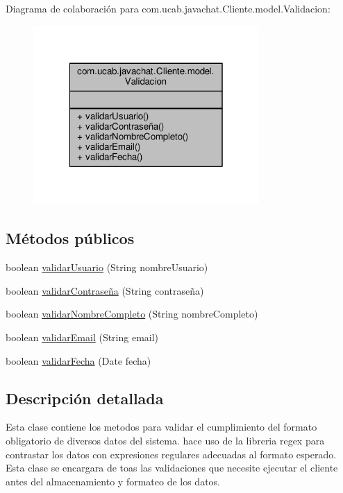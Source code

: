 Diagrama de colaboración para com.\-ucab.\-javachat.\-Cliente.\-model.\-Validacion\-:
\nopagebreak
\begin{figure}[H]
\begin{center}
\leavevmode
\includegraphics[width=244pt]{dc/d28/classcom_1_1ucab_1_1javachat_1_1_cliente_1_1model_1_1_validacion__coll__graph}
\end{center}
\end{figure}
\subsection*{Métodos públicos}
\begin{DoxyCompactItemize}
\item 
boolean \hyperlink{classcom_1_1ucab_1_1javachat_1_1_cliente_1_1model_1_1_validacion_a4d7e1104a20469f92144e9580b34f901}{validar\-Usuario} (String nombre\-Usuario)
\item 
boolean \hyperlink{classcom_1_1ucab_1_1javachat_1_1_cliente_1_1model_1_1_validacion_a03b6327d88c6fb0e69ef43ed72918e46}{validar\-Contraseña} (String contraseña)
\item 
boolean \hyperlink{classcom_1_1ucab_1_1javachat_1_1_cliente_1_1model_1_1_validacion_a1efa66eae747068c6492c79f9442be1a}{validar\-Nombre\-Completo} (String nombre\-Completo)
\item 
boolean \hyperlink{classcom_1_1ucab_1_1javachat_1_1_cliente_1_1model_1_1_validacion_ad8d244737f6462e48ab8d02a307a36f2}{validar\-Email} (String email)
\item 
boolean \hyperlink{classcom_1_1ucab_1_1javachat_1_1_cliente_1_1model_1_1_validacion_a3367f0c6cc3c94de17840e359ffd2433}{validar\-Fecha} (Date fecha)
\end{DoxyCompactItemize}


\subsection{Descripción detallada}
Esta clase contiene los metodos para validar el cumplimiento del formato obligatorio de diversos datos del sistema. hace uso de la libreria regex para contrastar los datos con expresiones regulares adecuadas al formato esperado. Esta clase se encargara de toas las validaciones que necesite ejecutar el cliente antes del almacenamiento y formateo de los datos.

